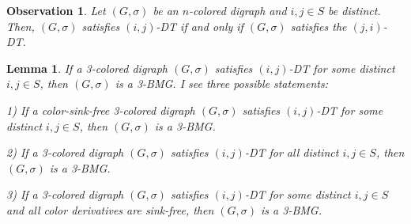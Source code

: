 \documentclass[final,3p,times]{elsarticle}
\newtheorem{lemma}[theorem]{Lemma}%
\newtheorem{fact}{Observation}[section]
\newcommand{\ak}[1]{\begingroup\color{orange}#1\endgroup}
\newcommand{\mh}[1]{\begingroup\color{blue}#1\endgroup}
\begin{document}
\begin{fact}
\mh{Let $(G,\sigma)$ be an $n$-colored digraph and $i,j\in S$ be distinct. 
Then, $(G,\sigma)$ satisfies $(i,j)$-DT  if and only if 
$(G,\sigma)$ satisfies the $(j,i)$-DT.}
\end{fact}




\begin{lemma}\label{lem:sufficient_condition}
\mh{If a 3-colored digraph $(G,\sigma)$ satisfies $(i,j)$-DT for some 
distinct $i,j\in S$, then $(G,\sigma)$ is a 3-BMG.}
\ak{I see three possible statements:

1) If a color-sink-free 3-colored digraph $(G,\sigma)$ satisfies $(i,j)$-DT for some
distinct $i,j\in S$, then $(G,\sigma)$ is a 3-BMG.

2) If a 3-colored digraph $(G,\sigma)$ satisfies $(i,j)$-DT for all  
distinct $i,j\in S$, then $(G,\sigma)$ is a 3-BMG.

3) If a 3-colored digraph $(G,\sigma)$ satisfies $(i,j)$-DT for some  
distinct $i,j\in S$ and all color derivatives are sink-free, then $(G,\sigma)$ is a 3-BMG.}
\end{lemma}
\end{document}
